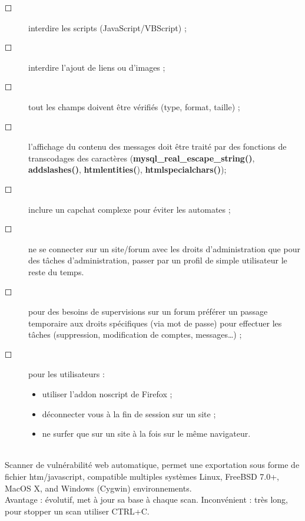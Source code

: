 \documentclass[a4paper,11pt]{article}				    %
\begin{document}
{\begin{description}
   \item[$\Square$] interdire les scripts (JavaScript/VBScript) ;
   \item[$\Square$] interdire l'ajout de liens ou d'images ;
   \item[$\Square$] tout les champs doivent \^etre v\'erifi\'es (type, format, taille) ;
   \item[$\Square$] l'affichage du contenu des messages doit \^etre trait\'e par des fonctions de transcodages des caract\`eres (\textbf{mysql\_real\_escape\_string()}, \textbf{addslashes()}, \textbf{htmlentities(}), \textbf{htmlspecialchars()});

   \item[$\Square$] inclure un capchat complexe pour \'eviter les automates ;
   \item[$\Square$] ne se connecter sur un site/forum avec les droits d'administration que pour des t\^aches d'administration, 
passer par un profil de simple utilisateur le reste du temps.
   \item[$\Square$] pour des besoins de supervisions sur un forum pr\'ef\'erer un passage temporaire aux droits sp\'ecifiques (via mot de passe) pour effectuer les t\^aches (suppression, modification de comptes, messages\dots{}) ;
   \item[$\Square$] pour les utilisateurs : 
		\begin{itemize}
			\item utiliser l'addon noscript de Firefox ;
			\item d\'econnecter vous \`a la fin de session sur un site ;
			\item ne surfer que sur un site \`a la fois sur le m\^eme navigateur.
		\end{itemize}
\end{description}
}
{
\\Scanner de vuln\'erabilit\'e web automatique, permet une exportation sous forme de fichier htm/javascript, compatible multiples syst\`emes
Linux, FreeBSD 7.0+, MacOS X, and Windows (Cygwin) environnements.\\
Avantage : \'evolutif, met \`a jour sa base \`a chaque scan.
Inconv\'enient : tr\`es long, pour stopper un scan utiliser CTRL+C.
}
\end{document}
